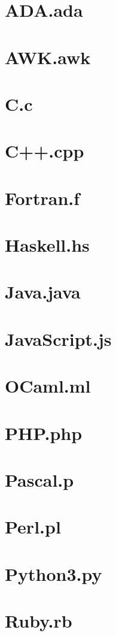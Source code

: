 \documentclass{article}
\begin{document}
\section*{ADA.ada}


\section*{AWK.awk}


\section*{C.c}


\section*{C++.cpp}


\section*{Fortran.f}


\section*{Haskell.hs}


\section*{Java.java}


\section*{JavaScript.js}


\section*{OCaml.ml}


\section*{PHP.php}


\section*{Pascal.p}


\section*{Perl.pl}


\section*{Python3.py}


\section*{Ruby.rb}

\end{document}
